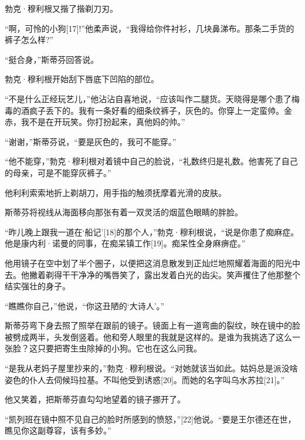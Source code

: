 \documentclass{article}
\begin{document}
勃克·穆利根又揩了揩剃刀刃。



“啊，可怜的小狗[17]!”他柔声说，“我得给你件衬衫，几块鼻涕布。那条二手货的裤子怎么样?”



“挺合身，”斯蒂芬回答说。



勃克·穆利根开始刮下唇底下凹陷的部位。



“不是什么正经玩艺儿，”他沾沾自喜地说，“应该叫作二腿货。天晓得是哪个患了梅毒的酒疯子丢下的。我有一条好看的细条纹裤子，灰色的。你穿上一定蛮帅。金赤，我不是在开玩笑。你打扮起来，真他妈的帅。”



“谢谢，”斯蒂芬说，“要是灰色的，我可不能穿。”



“他不能穿，”勃克·穆利根对着镜中自己的脸说，“礼数终归是礼数。他害死了自己的母亲，可是不能穿灰裤子。”



他利利索索地折上剃胡刀，用手指的触须抚摩着光滑的皮肤。



斯蒂芬将视线从海面移向那张有着一双灵活的烟蓝色眼睛的胖脸。



“昨儿晚上跟我一道在‘船记’[18]的那个人，”勃克·穆利根说，“说是你患了痴麻症。他是康内利·诺曼的同事，在痴呆镇工作[19]。痴呆性全身麻痹症。”



他用镜子在空中划了半个圈子，以便把这消息散发到正灿烂地照耀着海面的阳光中去。他撇着剃得干干净净的嘴唇笑了，露出发着白光的齿尖。笑声攫住了他那整个结实强壮的身子。



“瞧瞧你自己，”他说，“你这丑陋的‘大诗人’。”



斯蒂芬弯下身去照了照举在跟前的镜子。镜面上有一道弯曲的裂纹，映在镜中的脸被劈成两半，头发倒竖着。他和旁人眼里的我就是这样的。是谁为我挑选了这么一张脸？这只要把寄生虫除掉的小狗。它也在这么问我。



“是我从老妈子屋里抄来的，”勃克·穆利根说。“对她就该当如此。姑妈总是派没啥姿色的仆人去伺候玛拉基。不叫他受到诱惑[20]。而她的名字叫乌水苏拉[21]。”



他又笑着，把斯蒂芬直勾勾地望着的镜子挪开了。



“凯列班在镜中照不见自己的脸时所感到的愤怒，”[22]他说。“要是王尔德还在世，瞧见你这副尊容，该有多妙。”
\end{document}
